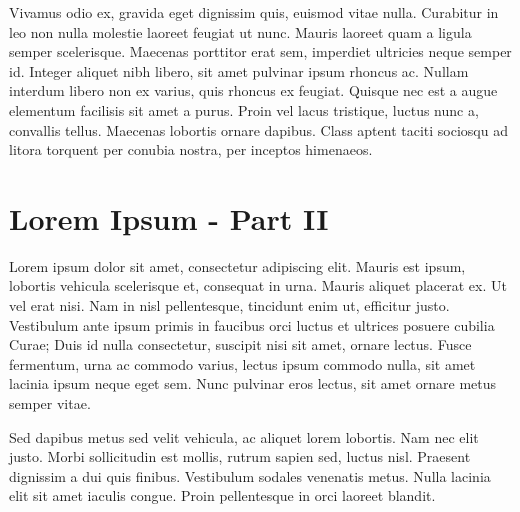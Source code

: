 \documentclass[
	12pt,				%
    oneside,			%
	a4paper,			%
	english,			%
	french,				%
	spanish,			%
	brazil				%
	]{abntex2}
\begin{document}
Vivamus odio ex, gravida eget dignissim quis, euismod vitae nulla. Curabitur in leo non nulla molestie laoreet feugiat ut nunc. Mauris laoreet quam a ligula semper scelerisque. Maecenas porttitor erat sem, imperdiet ultricies neque semper id. Integer aliquet nibh libero, sit amet pulvinar ipsum rhoncus ac. Nullam interdum libero non ex varius, quis rhoncus ex feugiat. Quisque nec est a augue elementum facilisis sit amet a purus. Proin vel lacus tristique, luctus nunc a, convallis tellus. Maecenas lobortis ornare dapibus. Class aptent taciti sociosqu ad litora torquent per conubia nostra, per inceptos himenaeos.


\section{Lorem Ipsum - Part II}

Lorem ipsum dolor sit amet, consectetur adipiscing elit. Mauris est ipsum, lobortis vehicula scelerisque et, consequat in urna. Mauris aliquet placerat ex. Ut vel erat nisi. Nam in nisl pellentesque, tincidunt enim ut, efficitur justo. Vestibulum ante ipsum primis in faucibus orci luctus et ultrices posuere cubilia Curae; Duis id nulla consectetur, suscipit nisi sit amet, ornare lectus. Fusce fermentum, urna ac commodo varius, lectus ipsum commodo nulla, sit amet lacinia ipsum neque eget sem. Nunc pulvinar eros lectus, sit amet ornare metus semper vitae.

Sed dapibus metus sed velit vehicula, ac aliquet lorem lobortis. Nam nec elit justo. Morbi sollicitudin est mollis, rutrum sapien sed, luctus nisl. Praesent dignissim a dui quis finibus. Vestibulum sodales venenatis metus. Nulla lacinia elit sit amet iaculis congue. Proin pellentesque in orci laoreet blandit.


\postextual



%
%
\end{document}

